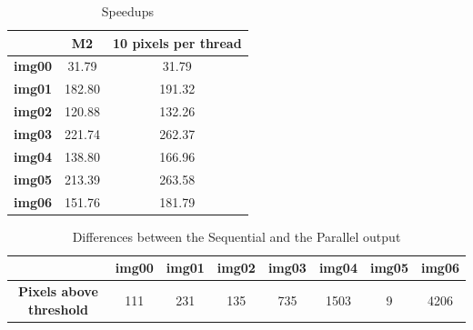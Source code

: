 \documentclass[a4paper]{article}
\begin{document}
\begin{table}[!ht]
\centering
\label{tab:darker_sp}
\begin{tabular}{|c|c|c|}
\hline
               & \textbf{M2} & \textbf{10 pixels per thread} \\ \hline
\textbf{img00} & 31.79       & 31.79                         \\ \hline
\textbf{img01} & 182.80      & 191.32                        \\ \hline
\textbf{img02} & 120.88      & 132.26                        \\ \hline
\textbf{img03} & 221.74      & 262.37                        \\ \hline
\textbf{img04} & 138.80      & 166.96                        \\ \hline
\textbf{img05} & 213.39      & 263.58                        \\ \hline
\textbf{img06} & 151.76      & 181.79                        \\ \hline
\end{tabular}
\caption{Speedups}
\end{table}
\FloatBarrier

\begin{table}[!ht]
\centering
\label{tab:pxabd}
\begin{tabular}{|c|l|c|c|l|l|l|l|}
\hline
\textbf{}                        & \textbf{img00}           & \textbf{img01} & \textbf{img02} & \textbf{img03}           & \textbf{img04}            & \textbf{img05}         & \textbf{img06}            \\ \hline
\textbf{Pixels above  threshold} & \multicolumn{1}{c|}{111} & 231            & 135            & \multicolumn{1}{c|}{735} & \multicolumn{1}{c|}{1503} & \multicolumn{1}{c|}{9} & \multicolumn{1}{c|}{4206} \\ \hline
\end{tabular}
\caption{Differences between the Sequential and the Parallel output}
\end{table}
\end{document}
